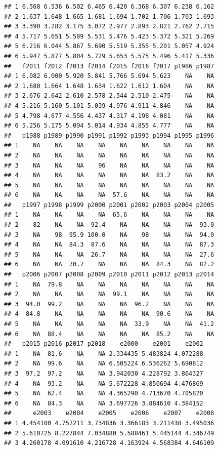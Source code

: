 \documentclass[
]{book}
\begin{document}
\begin{verbatim}
## 1 6.568 6.536 6.502 6.465 6.420 6.368 6.307 6.238 6.162
## 2 1.637 1.648 1.665 1.681 1.694 1.702 1.706 1.703 1.693
## 3 3.390 3.282 3.175 3.072 2.977 2.893 2.821 2.762 2.715
## 4 5.717 5.651 5.589 5.531 5.476 5.423 5.372 5.321 5.269
## 5 6.216 6.044 5.867 5.690 5.519 5.355 5.201 5.057 4.924
## 6 5.947 5.877 5.804 5.729 5.653 5.575 5.496 5.417 5.336
##   f2011 f2012 f2013 f2014 f2015 f2016 f2017 p1986 p1987
## 1 6.082 6.000 5.920 5.841 5.766 5.694 5.623    NA    NA
## 2 1.680 1.664 1.648 1.634 1.622 1.612 1.604    NA    NA
## 3 2.676 2.642 2.610 2.578 2.544 2.510 2.475    NA    NA
## 4 5.216 5.160 5.101 5.039 4.976 4.911 4.846    NA    NA
## 5 4.798 4.677 4.556 4.437 4.317 4.198 4.081    NA    NA
## 6 5.256 5.175 5.094 5.014 4.934 4.855 4.777    NA    NA
##   p1988 p1989 p1990 p1991 p1992 p1993 p1994 p1995 p1996
## 1    NA    NA    NA    NA    NA    NA    NA    NA    NA
## 2    NA    NA    NA    NA    NA    NA    NA    NA    NA
## 3    NA    NA    NA    96    NA    NA    NA    NA    NA
## 4    NA    NA    NA    NA    NA    NA  83.2    NA    NA
## 5    NA    NA    NA    NA    NA    NA    NA    NA    NA
## 6    NA    NA    NA    NA  57.6    NA    NA    NA    NA
##   p1997 p1998 p1999 p2000 p2001 p2002 p2003 p2004 p2005
## 1    NA    NA    NA    NA  65.6    NA    NA    NA    NA
## 2    82    NA    NA  92.4    NA    NA    NA    NA  93.0
## 3    NA    98  95.9 100.0    NA    98    NA    NA  94.0
## 4    NA    NA  84.3  87.6    NA    NA    NA    NA  87.3
## 5    NA    NA    NA  26.7    NA    NA    NA    NA  27.6
## 6    NA    NA  70.7    NA    NA    NA  84.3    NA  82.2
##   p2006 p2007 p2008 p2009 p2010 p2011 p2012 p2013 p2014
## 1    NA  79.8    NA    NA    NA    NA    NA    NA    NA
## 2    NA    NA    NA    NA  99.1    NA    NA    NA    NA
## 3  94.0  99.2    NA    NA    NA  96.2    NA    NA    NA
## 4  84.8    NA    NA    NA    NA    NA  90.6    NA    NA
## 5    NA    NA    NA    NA    NA  33.9    NA    NA  41.2
## 6    NA  88.4    NA    NA    NA    NA  85.2    NA    NA
##   p2015 p2016 p2017 p2018    e2000    e2001    e2002
## 1    NA  81.6    NA    NA 2.334435 5.483824 4.072288
## 2    NA  99.6    NA    NA 6.505224 6.536262 5.690812
## 3  97.2  97.2    NA    NA 3.942030 4.228792 3.864327
## 4    NA  93.2    NA    NA 5.672228 4.850694 4.476869
## 5    NA  62.4    NA    NA 4.365290 4.713670 4.705820
## 6    NA  84.3    NA    NA 3.697726 3.884610 4.384152
##      e2003    e2004    e2005    e2006    e2007    e2008
## 1 4.454100 4.757211 3.734836 3.366183 3.211438 3.495036
## 2 5.610725 8.227844 7.034880 5.588461 5.445144 4.346749
## 3 4.260178 4.091610 4.216728 4.163924 4.568384 4.646109

\end{verbatim}
\end{document}
